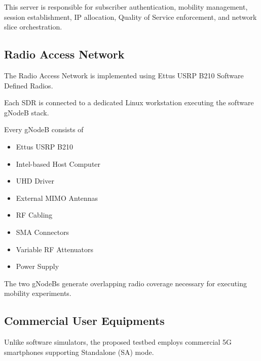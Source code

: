 \documentclass[12pt,a4paper]{article}\usepackage[a4paper,margin=1in]{geometry}\usepackage{graphicx}\usepackage{longtable}\usepackage{booktabs}\usepackage{hyperref}\usepackage{enumitem}\usepackage{amsmath}\usepackage{tikz}\usepackage{pgfgantt}\usepackage{setspace}\setstretch{1.15}\usetikzlibrary{positioning,arrows.meta,shapes.geometric}
\begin{document}
	This server is responsible for subscriber authentication, mobility management, session establishment, IP allocation, Quality of Service enforcement, and network slice orchestration.
	
	
	\subsection{Radio Access Network}
	
	The Radio Access Network is implemented using Ettus USRP B210 Software Defined Radios.
	
	Each SDR is connected to a dedicated Linux workstation executing the software gNodeB stack.
	
	Every gNodeB consists of
	
	\begin{itemize}
		
		\item Ettus USRP B210
		
		\item Intel-based Host Computer
		
		\item UHD Driver
		
		\item External MIMO Antennas
		
		\item RF Cabling
		
		\item SMA Connectors
		
		\item Variable RF Attenuators
		
		\item Power Supply
		
	\end{itemize}
	
	The two gNodeBs generate overlapping radio coverage necessary for executing mobility experiments.
	
	
	\subsection{Commercial User Equipments}
	
	Unlike software simulators, the proposed testbed employs commercial 5G smartphones supporting Standalone (SA) mode.
	
\end{document}
